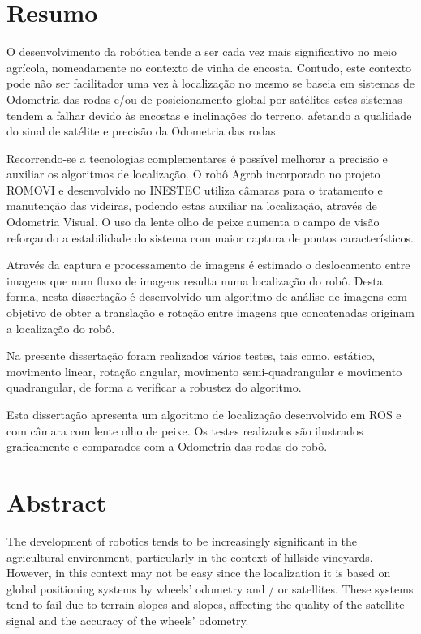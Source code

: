 \chapter*{Resumo}



O desenvolvimento da robótica tende a ser cada vez mais significativo no meio agrícola, nomeadamente no contexto de vinha de encosta. Contudo, este contexto pode não ser facilitador uma vez à localização no mesmo se baseia em sistemas de Odometria das rodas e/ou de posicionamento global por satélites estes sistemas tendem a falhar devido às encostas  e inclinações do terreno, afetando a qualidade do sinal de satélite e precisão da Odometria das rodas.

Recorrendo-se a  tecnologias complementares é possível melhorar a precisão e auxiliar os algoritmos de localização. O robô Agrob incorporado no projeto ROMOVI e desenvolvido no INESTEC  utiliza câmaras para o tratamento e manutenção das videiras, podendo estas auxiliar na localização, através de Odometria Visual. O uso da lente olho de peixe aumenta o campo de visão reforçando a estabilidade do sistema com maior captura de pontos característicos.

Através da captura e processamento de imagens é estimado o deslocamento entre imagens que num fluxo de imagens resulta numa localização do robô. Desta forma, nesta dissertação é desenvolvido um algoritmo de análise de imagens com objetivo de obter a translação e rotação entre imagens que concatenadas originam a localização do robô.


Na presente dissertação foram realizados vários testes, tais como, estático, movimento linear, rotação angular, movimento semi-quadrangular e movimento quadrangular, de forma a verificar a robustez do algoritmo.


Esta dissertação apresenta um algoritmo de localização desenvolvido em ROS e com câmara com lente olho de peixe. Os testes realizados são ilustrados graficamente e comparados com a Odometria das rodas do robô.


\chapter*{Abstract}


The development of robotics tends to be increasingly significant in the agricultural environment, particularly in the context of hillside vineyards. However, in this context may not be easy since the localization it is based on global positioning systems by wheels' odometry and / or satellites. These systems tend to fail due to terrain slopes and slopes, affecting the quality of the satellite signal and the accuracy of the wheels' odometry.


